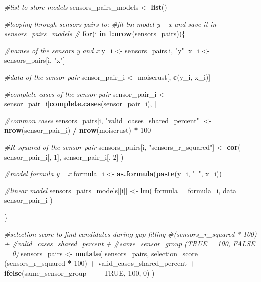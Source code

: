 \documentclass[]{article}
\newenvironment{Shaded}{\begin{snugshade}}{\end{snugshade}}
\newcommand{\CommentTok}[1]{\textcolor[rgb]{0.56,0.35,0.01}{\textit{#1}}}
\newcommand{\ControlFlowTok}[1]{\textcolor[rgb]{0.13,0.29,0.53}{\textbf{#1}}}
\newcommand{\DataTypeTok}[1]{\textcolor[rgb]{0.13,0.29,0.53}{#1}}
\newcommand{\DecValTok}[1]{\textcolor[rgb]{0.00,0.00,0.81}{#1}}
\newcommand{\KeywordTok}[1]{\textcolor[rgb]{0.13,0.29,0.53}{\textbf{#1}}}
\newcommand{\NormalTok}[1]{#1}
\newcommand{\OperatorTok}[1]{\textcolor[rgb]{0.81,0.36,0.00}{\textbf{#1}}}
\newcommand{\OtherTok}[1]{\textcolor[rgb]{0.56,0.35,0.01}{#1}}
\newcommand{\StringTok}[1]{\textcolor[rgb]{0.31,0.60,0.02}{#1}}
\begin{document}
\begin{Shaded}
\begin{Highlighting}[]
{{{{{{{{{\CommentTok{#list to store models}
\NormalTok{sensors_pairs_models <-}\StringTok{ }\KeywordTok{list}\NormalTok{()}

\CommentTok{#looping through sensors pairs to:}
\CommentTok{#fit lm model y ~ x and save it in sensors_pairs_models}
\CommentTok{#}
\ControlFlowTok{for}\NormalTok{(i }\ControlFlowTok{in} \DecValTok{1}\OperatorTok{:}\KeywordTok{nrow}\NormalTok{(sensors_pairs))\{}
  
  \CommentTok{#names of the sensors y and x}
\NormalTok{  y_i <-}\StringTok{ }\NormalTok{sensors_pairs[i, }\StringTok{"y"}\NormalTok{]}
\NormalTok{  x_i <-}\StringTok{ }\NormalTok{sensors_pairs[i, }\StringTok{"x"}\NormalTok{]}
  
  \CommentTok{#data of the sensor pair}
\NormalTok{  sensor_pair_i <-}\StringTok{ }\NormalTok{moiscrust[, }\KeywordTok{c}\NormalTok{(y_i, x_i)]}
  
  \CommentTok{#complete cases of the sensor pair}
\NormalTok{  sensor_pair_i <-}\StringTok{ }\NormalTok{sensor_pair_i[}\KeywordTok{complete.cases}\NormalTok{(sensor_pair_i), ]}
   
  \CommentTok{#common cases}
\NormalTok{  sensors_pairs[i, }\StringTok{"valid_cases_shared_percent"}\NormalTok{] <-}\StringTok{ }
\StringTok{    }\KeywordTok{nrow}\NormalTok{(sensor_pair_i) }\OperatorTok{/}\StringTok{ }\KeywordTok{nrow}\NormalTok{(moiscrust) }\OperatorTok{*}\StringTok{ }\DecValTok{100}
  
  \CommentTok{#R squared of the sensor pair}
\NormalTok{  sensors_pairs[i, }\StringTok{"sensors_r_squared"}\NormalTok{] <-}\StringTok{ }\KeywordTok{cor}\NormalTok{(}
\NormalTok{    sensor_pair_i[, }\DecValTok{1}\NormalTok{],}
\NormalTok{    sensor_pair_i[, }\DecValTok{2}\NormalTok{]}
\NormalTok{    )}
  
  \CommentTok{#model formula y ~ x}
\NormalTok{  formula_i <-}\StringTok{ }\KeywordTok{as.formula}\NormalTok{(}\KeywordTok{paste}\NormalTok{(y_i, }\StringTok{"~"}\NormalTok{, x_i))}
  
  \CommentTok{#linear model}
\NormalTok{  sensors_pairs_models[[i]] <-}\StringTok{ }\KeywordTok{lm}\NormalTok{(}
    \DataTypeTok{formula =}\NormalTok{ formula_i,}
    \DataTypeTok{data =}\NormalTok{ sensor_pair_i}
\NormalTok{  )}
  
\NormalTok{\}}

\CommentTok{#selection score to find candidates during gap filling }
\CommentTok{#(sensors_r_squared * 100) +}
\CommentTok{#valid_cases_shared_percent + }
\CommentTok{#same_sensor_group (TRUE = 100, FALSE = 0)}
\NormalTok{sensors_pairs <-}\StringTok{ }\KeywordTok{mutate}\NormalTok{(}
\NormalTok{  sensors_pairs,}
  \DataTypeTok{selection_score =} 
\NormalTok{    (sensors_r_squared }\OperatorTok{*}\StringTok{ }\DecValTok{100}\NormalTok{) }\OperatorTok{+}\StringTok{ }
\StringTok{    }\NormalTok{valid_cases_shared_percent }\OperatorTok{+}\StringTok{ }
\StringTok{    }\KeywordTok{ifelse}\NormalTok{(same_sensor_group }\OperatorTok{==}\StringTok{ }\OtherTok{TRUE}\NormalTok{, }\DecValTok{100}\NormalTok{, }\DecValTok{0}\NormalTok{)}
\NormalTok{)}

}}}}}}}}}
\end{Highlighting}
\end{Shaded}
\end{document}
